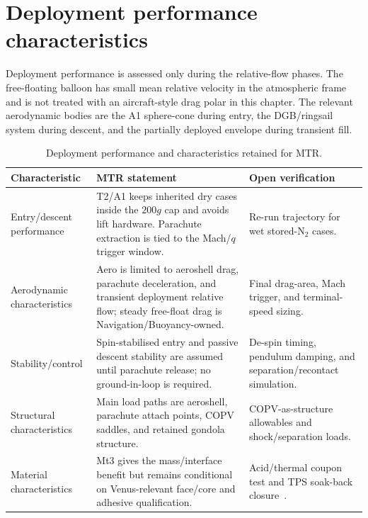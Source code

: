 \section{Deployment performance characteristics}
\label{sec:dep-performance}

Deployment performance is assessed only during the relative-flow phases. The free-floating balloon has small mean relative velocity in the atmospheric frame and is not treated with an aircraft-style drag polar in this chapter. The relevant aerodynamic bodies are the A1 sphere-cone during entry, the DGB/ringsail system during descent, and the partially deployed envelope during transient fill.

\begin{table}[ht]
\centering
\renewcommand{\arraystretch}{1}
\small
\caption{Deployment performance and characteristics retained for MTR.}
\label{tab:deployment-performance-summary}
\begin{tabularx}{\textwidth}{@{}p{} X p{}@{}}
\toprule
\textbf{Characteristic} & \textbf{MTR statement} & \textbf{Open verification} \\
\midrule
Entry/descent performance & T2/A1 keeps inherited dry cases inside the $200g$ cap and avoids lift hardware. Parachute extraction is tied to the Mach/$q$ trigger window. & Re-run trajectory for wet stored-N$_2$ cases. \\
Aerodynamic characteristics & Aero is limited to aeroshell drag, parachute deceleration, and transient deployment relative flow; steady free-float drag is Navigation/Buoyancy-owned. & Final drag-area, Mach trigger, and terminal-speed sizing. \\
Stability/control & Spin-stabilised entry and passive descent stability are assumed until parachute release; no ground-in-loop is required. & De-spin timing, pendulum damping, and separation/recontact simulation. \\
Structural characteristics & Main load paths are aeroshell, parachute attach points, COPV saddles, and retained gondola structure. & COPV-as-structure allowables and shock/separation loads. \\
Material characteristics & Mt3 gives the mass/interface benefit but remains conditional on Venus-relevant face/core and adhesive qualification. & Acid/thermal coupon test and TPS soak-back closure~\cite{Yavrouian2003}. \\
\bottomrule
\end{tabularx}
\end{table}

